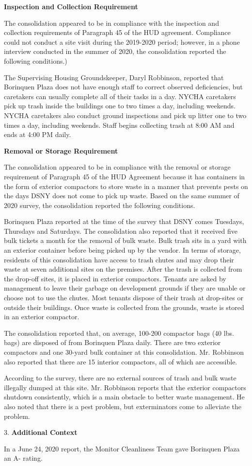

\textbf{Inspection and Collection Requirement}

The consolidation appeared to be in compliance with the inspection and collection requirements of Paragraph 45 of the HUD agreement. Compliance could not conduct a site visit during the 2019-2020 period; however, in a phone interview conducted in the summer of 2020, the consolidation reported the following conditions.)

The Supervising Housing Groundskeeper, Daryl Robbinson, reported that Borinquen Plaza does not have enough staff to correct observed deficiencies, but caretakers can usually complete all of their tasks in a day. NYCHA caretakers pick up trash inside the buildings one to two times a day, including weekends. NYCHA caretakers also conduct ground inspections and pick up litter one to two times a day, including weekends. Staff begins collecting trash at 8:00 AM and ends at 4:00 PM daily. 

\textbf{Removal or Storage Requirement}

The consolidation appeared to be in compliance with the  removal or storage requirement of Paragraph  45 of the HUD Agreement because it has containers in the form of exterior compactors to store waste in a manner that prevents pests on the days DSNY does not come to pick up waste. Based on the same summer of  2020 survey, the consolidation reported the following conditions.

Borinquen Plaza reported at the time of the survey that DSNY comes Tuesdays, Thursdays and Saturdays. The consolidation also reported that it received five bulk tickets a month for the removal of bulk waste. Bulk trash sits in a yard with an exterior container before being picked up by the vendor. In terms of storage, residents of this consolidation have access to trash chutes and may drop their waste at seven additional sites on the premises. After the trash is collected from the drop-off sites, it is placed in exterior compactors. Tenants are asked by management to leave their garbage on development grounds if they are unable or choose not to use the chutes. Most tenants dispose of their trash at drop-sites or outside their buildings. Once waste is collected from the grounds, waste is stored in an exterior compactor. 

The consolidation reported that, on average, 100-200 compactor bags (40 lbs. bags)  are disposed of from Borinquen Plaza daily. There are two exterior compactors and one 30-yard bulk container at this consolidation. Mr. Robbinson also reported that there are 15 interior compactors, all of which are accessible. 

 According to the survey, there are no external sources of trash and bulk waste illegally dumped at this site. Mr. Robbinson reports that the exterior compactors shutdown consistently, which is a main obstacle to better waste management. He also noted that there is a pest problem, but exterminators come to alleviate the problem.

3. \textbf{Additional Context} 

In a June 24, 2020 report, the Monitor Cleanliness Team gave Borinquen Plaza an A- rating. 